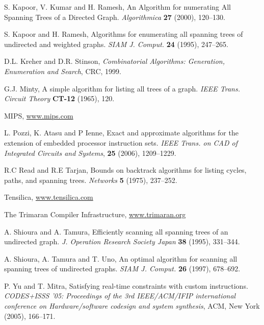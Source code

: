 \documentclass[11pt]{article}
\newcommand{\2}{\vspace{0.2 cm}}
\begin{document}
\begin{thebibliography}{99}
 S. Kapoor, V. Kumar and H. Ramesh, An Algorithm
for numerating All Spanning Trees of a Directed Graph. {\em
Algorithmica} {\bf 27} (2000), 120--130.


 S. Kapoor and H. Ramesh, Algorithms for
enumerating all spanning trees of undirected and weighted graphs.
{\em SIAM J. Comput.} {\bf 24} (1995), 247--265.

 D.L. Kreher and D.R. Stinson, {\em Combinatorial
Algorithms: Generation, Enumeration and Search}, CRC, 1999.



 G.J. Minty, A simple algorithm for listing all trees of a
graph. {\em IEEE Trans. Circuit Theory} {\bf CT-12} (1965),  120.


 MIPS, \url{www.mips.com}

 L. Pozzi, K. Atasu and P Ienne, Exact and
approximate algorithms for the extension of embedded processor
instruction sets. {\em IEEE Trans. on CAD of Integrated Circuits and
Systems}, {\bf 25} (2006), 1209--1229.

 R.C Read and R.E Tarjan, Bounds on backtrack algorithms for
listing cycles, paths, and spanning trees. {\em Networks} {\bf 5}
(1975), 237--252.


 Tensilica, \url{www.tensilica.com}

 The Trimaran Compiler Infrastructure, \url{www.trimaran.org}


 A. Shioura and A. Tamura, Efficiently scanning all spanning
trees of
an undirected graph. {\em J. Operation Research Society Japan} {\bf
38} (1995), 331--344.



 A. Shioura, A. Tamura and T. Uno, An optimal algorithm for
scanning all spanning trees of undirected graphs. {\em SIAM J.
Comput.} {\bf 26} (1997), 678--692.




 P. Yu and T. Mitra,
Satisfying real-time constraints with custom instructions. {\em
CODES+ISSS '05: Proceedings of the 3rd IEEE/ACM/IFIP international
conference on Hardware/software codesign and system synthesis}, ACM,
New York (2005), 166--171.


\end{thebibliography}
\end{document}
